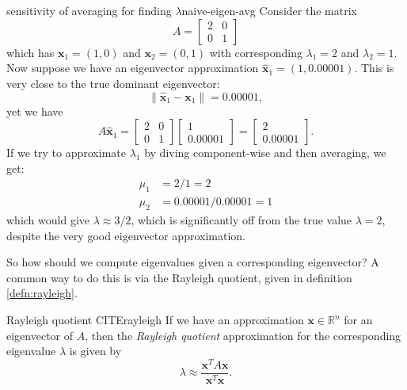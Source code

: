 \documentclass{article}
\let\vec\mathbf
\begin{document}
\begin{example}{sensitivity of averaging for finding $\lambda$}{naive-eigen-avg}
  Consider the matrix
  \begin{equation*}
    A = \begin{bmatrix}2 & 0 \\ 0 & 1\end{bmatrix}
  \end{equation*}
  which has $\vec{x}_1 = (1,0)$ and $\vec{x}_2 = (0,1)$ with corresponding $\lambda_1 = 2$ and $\lambda_2 = 1$. Now suppose we have an eigenvector approximation $\hat{\vec{x}}_1 = (1, 0.00001)$. This is very close to the true dominant eigenvector:
  \begin{equation*}
    \lVert \hat{\vec{x}}_1 - \vec{x}_1 \rVert = 0.00001,
  \end{equation*}
  yet we have
  \begin{equation*}
    A\hat{\vec{x}}_1 = \begin{bmatrix}2 & 0 \\ 0 & 1\end{bmatrix}\begin{bmatrix}1 \\ 0.00001\end{bmatrix} = \begin{bmatrix}2 \\ 0.00001\end{bmatrix}.
  \end{equation*}
  If we try to approximate $\lambda_1$ by diving component-wise and then averaging, we get:
  \begin{align*}
    \mu_1 &= 2 / 1 = 2 \\
    \mu_2 &= 0.00001 / 0.00001 = 1
  \end{align*}
  which would give $\lambda \approx 3/2$, which is significantly off from the true value $\lambda = 2$, despite the very good eigenvector approximation.
\end{example}

So how should we compute eigenvalues given a corresponding eigenvector? A common way to do this is via the Rayleigh quotient, given in definition \ref{defn:rayleigh}.

\begin{definition}{Rayleigh quotient CITE}{rayleigh}
  If we have an approximation $\vec{x} \in \mathbb{R}^n$ for an eigenvector of $A$, then the \textit{Rayleigh quotient} approximation for the corresponding eigenvalue $\lambda$ is given by
  \begin{equation*}
    \lambda \approx \frac{\vec{x}^TA\vec{x}}{\vec{x}^T\vec{x}}.
  \end{equation*}
\end{definition}
\end{document}
